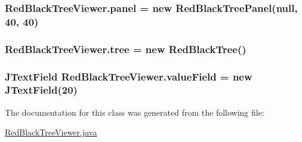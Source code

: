 \subsubsection[{\texorpdfstring{panel}{panel}}]{ Red\+Black\+Tree\+Viewer.\+panel = new {\bf Red\+Black\+Tree\+Panel}(null, 40, 40)\hspace{0.3cm}{\ttfamily [package]}}\hypertarget{class_red_black_tree_viewer_a5ca3120cf31ee3d78f016637dcdeb41e}{}\label{class_red_black_tree_viewer_a5ca3120cf31ee3d78f016637dcdeb41e}
\subsubsection[{\texorpdfstring{tree}{tree}}]{ Red\+Black\+Tree\+Viewer.\+tree = new {\bf Red\+Black\+Tree}()\hspace{0.3cm}{\ttfamily [package]}}\hypertarget{class_red_black_tree_viewer_a806efbd070af5c862352e9c98b1d4ccf}{}\label{class_red_black_tree_viewer_a806efbd070af5c862352e9c98b1d4ccf}
\subsubsection[{\texorpdfstring{value\+Field}{valueField}}]{\setlength{\rightskip}{0pt plus 5cm}J\+Text\+Field Red\+Black\+Tree\+Viewer.\+value\+Field = new J\+Text\+Field(20)\hspace{0.3cm}{\ttfamily [package]}}\hypertarget{class_red_black_tree_viewer_a1c5fcda6f8f3b95dba8d1507d6b76afc}{}\label{class_red_black_tree_viewer_a1c5fcda6f8f3b95dba8d1507d6b76afc}


The documentation for this class was generated from the following file\+:\begin{DoxyCompactItemize}
\item 
\hyperlink{_red_black_tree_viewer_8java}{Red\+Black\+Tree\+Viewer.\+java}\end{DoxyCompactItemize}
